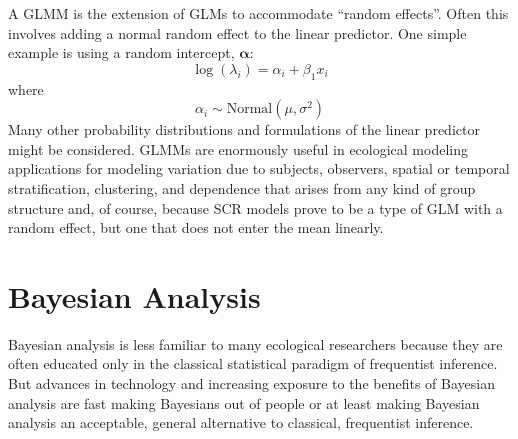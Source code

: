 A GLMM is the extension of GLMs to accommodate ``random
effects''. Often this involves adding a normal random effect to the
linear predictor. One simple example is using a random intercept,  ${\bm \alpha}$:
\[
 \log(\lambda_{i}) = \alpha_{i} + \beta_{1} x_{i}
\]
where
\[
 \alpha_{i} \sim \mbox{Normal}(\mu,\sigma^{2})
\]
Many other probability distributions and formulations of the linear
predictor might be considered.  GLMMs are enormously useful in
ecological modeling applications for modeling variation due to 
subjects, observers, spatial
or temporal stratification, clustering, and dependence that arises
from any kind of group structure and, of course, because SCR models
prove to be a type of GLM with a random effect, but one that does not
enter the mean linearly. 




\section{Bayesian Analysis}

Bayesian analysis is less familiar to many ecological researchers because
they are often educated only in the classical
statistical paradigm of frequentist inference. But advances in
technology and increasing exposure to the benefits of Bayesian analysis
are fast making Bayesians out of people or at least making Bayesian
analysis an acceptable, general alternative to classical, frequentist
inference.

